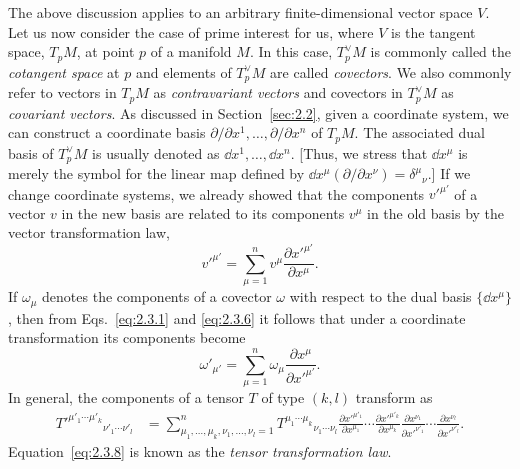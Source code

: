 The above discussion applies to an arbitrary finite-dimensional vector space \(V\).
Let us now consider the case of prime interest for us, where \(V\) is the tangent
space, \(T_pM\), at point \(p\) of a manifold \(M\).  In this case, \(T_p^\vee M\) is
commonly called the \emph{cotangent space} at \(p\) and elements of \(T_p^\vee M\) are
called \emph{covectors}.  We also commonly refer to vectors in \(T_pM\) as
\emph{contravariant vectors} and covectors in \(T_p^\vee M\) as \emph{covariant
vectors}.  As discussed in Section~\ref{sec:2.2}, given a coordinate system, we can
construct a coordinate basis \(\partial/\partial x^1,\ldots,\partial/\partial x^n\)
of \(T_pM\).  The associated dual basis of \(T_p^\vee M\) is usually denoted as
\(\dd x^1,\ldots,\dd x^n\).  [Thus, we stress that \(\dd x^\mu\) is merely the symbol for
the linear map defined by
\(\dd x^\mu(\partial/\partial x^\nu)=\delta^\mu{}_{\nu}\).]  If we change
coordinate systems, we already showed that the components \(v'^{\mu'}\) of a
vector \(v\) in the new basis are related to its components \(v^\mu\) in the old
basis by the vector transformation law,
\begin{equation}
  v'^{\mu'}=\sum_{\mu=1}^n
  v^\mu\frac{\partial x'^{\mu'}}{\partial x^\mu} .
  \tag{2.3.6}\label{eq:2.3.6}
\end{equation}
If \(\omega_\mu\) denotes the components of a covector \(\omega\) with respect to
the dual basis \(\{\dd x^\mu\}\), then from Eqs.~\eqref{eq:2.3.1} and
\eqref{eq:2.3.6} it follows that under a coordinate transformation its components
become
\begin{equation}
  \omega'_{\mu'}=\sum_{\mu=1}^n
  \omega_\mu\frac{\partial x^\mu}{\partial x'^{\mu'}} .
  \tag{2.3.7}\label{eq:2.3.7}
\end{equation}
In general, the components of a tensor \(T\) of type \((k,l)\) transform as
\begin{equation}
\begin{aligned}
  T'^{\mu'_1\cdots\mu'_k}{}_{\nu'_1\cdots\nu'_l}
  &={\sum}_{\mu_1,\ldots,\mu_k,\nu_1,\ldots,\nu_l=1}^n
  T^{\mu_1\cdots\mu_k}{}_{\nu_1\cdots\nu_l}
  \frac{\partial x'^{\mu'_1}}{\partial x^{\mu_1}}\cdots
  \frac{\partial x'^{\mu'_k}}{\partial x^{\mu_k}}
  \frac{\partial x^{\nu_1}}{\partial x'^{\nu'_1}}\cdots
  \frac{\partial x^{\nu_l}}{\partial x'^{\nu'_l}} .
\end{aligned}
\tag{2.3.8}\label{eq:2.3.8}
\end{equation}
Equation~\eqref{eq:2.3.8} is known as the \emph{tensor transformation law}.

